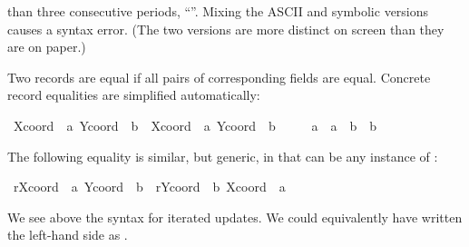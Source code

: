 \begin{isabellebody}
\begin{isamarkuptext}
\begin{warn}
  than three consecutive periods, ``\isa{{\isachardot}{\isachardot}{\isachardot}}''.  Mixing the ASCII
  and symbolic versions causes a syntax error.  (The two versions are
  more distinct on screen than they are on paper.)
  \end{warn}%
\end{isamarkuptext}%
\isamarkuptrue%
%
\isamarkuptrue%
%
\begin{isamarkuptext}%
Two records are equal if all pairs of
  corresponding fields are equal.  Concrete record equalities are
  simplified automatically:%
\end{isamarkuptext}%
\isamarkuptrue%
\ {\isachardoublequote}{\isacharparenleft}{\isasymlparr}Xcoord\ {\isacharequal}\ a{\isacharcomma}\ Ycoord\ {\isacharequal}\ b{\isasymrparr}\ {\isacharequal}\ {\isasymlparr}Xcoord\ {\isacharequal}\ a{\isacharprime}{\isacharcomma}\ Ycoord\ {\isacharequal}\ b{\isacharprime}{\isasymrparr}{\isacharparenright}\ {\isacharequal}\isanewline
\ \ \ \ {\isacharparenleft}a\ {\isacharequal}\ a{\isacharprime}\ {\isasymand}\ b\ {\isacharequal}\ b{\isacharprime}{\isacharparenright}{\isachardoublequote}\isanewline
\ \ \isamarkupfalse%
\isamarkupfalse%
%
\begin{isamarkuptext}%
The following equality is similar, but generic, in that 
  can be any instance of :%
\end{isamarkuptext}%
\isamarkuptrue%
\ {\isachardoublequote}r{\isasymlparr}Xcoord\ {\isacharcolon}{\isacharequal}\ a{\isacharcomma}\ Ycoord\ {\isacharcolon}{\isacharequal}\ b{\isasymrparr}\ {\isacharequal}\ r{\isasymlparr}Ycoord\ {\isacharcolon}{\isacharequal}\ b{\isacharcomma}\ Xcoord\ {\isacharcolon}{\isacharequal}\ a{\isasymrparr}{\isachardoublequote}\isanewline
\ \ \isamarkupfalse%
\isamarkupfalse%
%
\begin{isamarkuptext}%
We see above the syntax for iterated updates.  We could equivalently
  have written the left-hand side as .


\end{isamarkuptext}
\end{isabellebody}
